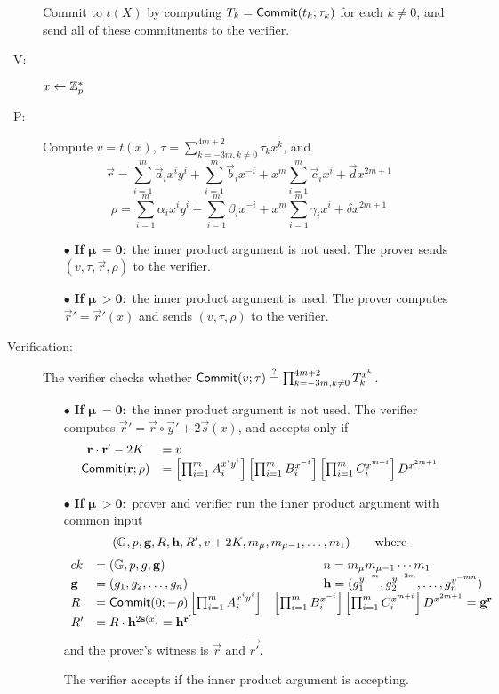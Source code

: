 \begin{description}
Commit to $t(X)$ by computing $T_k = \mathsf{Commit}(t_k;\tau_k)$ for each $k\neq 0$, and send all of these commitments to the verifier.

\item[\ V:] $x\gets \mathbb{Z}_p^*$
\item[\ P:] Compute $v = t(x)$, ${\tau} = \sum_{k=-3m, k\neq 0}^{4m+2} \tau_k x^k$, and 
$$\vec{r} =\sum_{i=1}^m\vec{a}_{i}x^{i} y^i+\sum_{i=1}^m\vec{b}_{i} x^{-i}+x^m \sum_{i=1}^m\vec{c}_{i} x^{i}+\vec{d}x^{2m+1}$$
$$\rho =\sum_{i=1}^m\alpha_{i}x^{i} y^i+\sum_{i=1}^m\beta_{i} x^{-i}+x^m \sum_{i=1}^m\gamma_{i} x^{i}+\delta x^{2m+1}$$ 
\begin{itemize}
\item [$\bullet$] \textbf{If} $\boldsymbol\mu\: \mathbf{=0:}$ the inner product argument is not used. 
The prover sends $(v,\tau,\vec{r},\rho)$ to the verifier.

\item  [$\bullet$] \textbf{If} $\boldsymbol\mu\: \mathbf{>0:}$ the inner product argument is used. The prover computes $\vec{r}' = \vec{r}'(x)$ and sends $(v,\tau,\rho)$ to the verifier.
\end{itemize}
\item[Verification:] The verifier checks whether $\mathsf{Commit}(v;\tau) \overset{?}{=} \prod_{k=-3m, k\neq 0}^{4m+2} T_k^{x^k}$.
\begin{itemize}
\item [$\bullet$] \textbf{If} $\boldsymbol\mu\: \mathbf{=0:}$ the inner product argument is not used. The verifier computes $\vec{r}'=\vec{r}\circ \vec{y}' +2\vec{s}(x)$, and accepts only if
$$
\begin{array}{cl}
\mathbf{r}\cdot \mathbf{r}'-2K &=v\\
\mathsf{Commit}(\mathbf{r};\rho) & = \left[ \prod_{i=1}^m A_{i}^{x^i y^i} \right] \left[ \prod_{i=1}^m B_{i}^{x^{-i}}\right] \left[ \prod_{i=1}^mC_{i}^{x^{m+i}}\right]D^{x^{2m+1}}\\
\end{array}$$

\item  [$\bullet$] \textbf{If} $\boldsymbol\mu\: \mathbf{>0:}$
prover and verifier run the inner product argument with common input
$$ (\mathbb{G},p,\mathbf{g},R,\mathbf{h},R',v+2K,m_\mu,m_{\mu-1},\ldots,m_1)\mbox{\qquad where}$$
$$
\begin{array}{lll}
 ck&= (\mathbb{G},p,g,\mathbf{g}) & \qquad \qquad n=m_\mu m_{\mu-1}\cdots m_1\\
 \mathbf{g} &=(g_1,g_2,\ldots,g_n) &  \qquad\qquad   \mathbf{h} =(g_1^{y^{-m}},g_2^{y^{-2m}},\ldots,g_n^{y^{-mn}})\\
 R &= \mathsf{Commit}(0;-\rho)\left[ \prod_{i=1}^m A_{i}^{x^i y^i} \right] &\left[ \prod_{i=1}^m B_{i}^{x^{-i}}\right] \left[ \prod_{i=1}^mC_{i}^{x^{m+i}}\right]D^{x^{2m+1}} = \mathbf{g}^{\mathbf{r}}
\\
R'&=R \cdot \mathbf{h}^{2\mathbf{s}(x)} = \mathbf{h}^{\mathbf{r}'}&\\
\end{array} 
$$
and the prover's witness is $\vec{r}$ and $\vec{r'}$.

The verifier accepts if the inner product argument is accepting.
\end{itemize}
\end{description}

